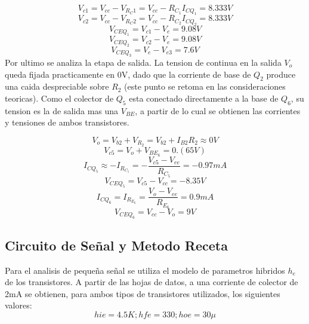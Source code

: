 \documentclass[11pt,a4paper]{article}
\begin{document}
\begin{equation}
V_{c1} = V_{cc} - V_{R_C1} = V_{cc} - R_{C_1} I_{CQ_1} = 8.333V
\end{equation}
\begin{equation}
V_{c2} = V_{cc} - V_{R_C2} = V_{cc} - R_{C_2} I_{CQ_2} = 8.333V
\end{equation}
\begin{equation}
V_{CEQ_1} = V_{c1} - V_{e} = 9.08V
\end{equation}
\begin{equation}
V_{CEQ_2} = V_{c2} - V_{e} = 9.08V
\end{equation}
\begin{equation}
V_{CEQ_3} = V_{e} - V_{e3} = 7.6V
\end{equation}
Por ultimo se analiza la etapa de salida. La tension de continua en la salida \(V_o\) queda fijada practicamente en 0V, dado que la corriente de base de \(Q_2\) produce una caida despreciable sobre \(R_2\) (este punto se retoma en las consideraciones teoricas). Como el colector de \(Q_5\) esta conectado directamente a la base de \(Q_6\), su tension es la de salida mas una \(V_{BE}\), a partir de lo cual se obtienen las corrientes y tensiones de ambos transistores.

\begin{equation}
V_o = V_{b2} + V_{R_2} = V_{b2} + I_{B2} R_2 \approx 0V
\end{equation}
\begin{equation}
V_{c5} = V_o + V_{BE_6} = 0.(65V)
\end{equation}
\begin{equation}
I_{CQ_5} \approx -I_{R_{C_5}} = -\frac{V_{c5} - V_{ee}}{R_{C_5}} = -0.97mA
\end{equation}  
\begin{equation}
V_{CEQ_5} = V_{c5} - V_{cc} = -8.35V
\end{equation}
\begin{equation}
I_{CQ_6} = I_{R_{E_6}} = \frac{V_o - V_{ee}}{R_{E_6}} = 0.9mA
\end{equation} 
\begin{equation}
V_{CEQ_6} = V_{cc} - V_{o} = 9V
\end{equation}

\subsection{Circuito de Señal y Metodo Receta}

Para el analisis de pequeña señal se utiliza el modelo de parametros hibridos \(h_e\) de los transistores. A partir de las hojas de datos, a una corriente de colector de 2mA se obtienen, para ambos tipos de transistores utilizados, los siguientes valores:
\begin{equation}
hie = 4.5K; hfe=330; hoe=30\mu
\end{equation}
\end{document}
